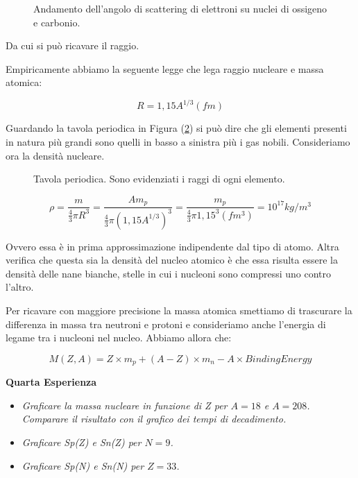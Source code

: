 \documentclass [a4paper, twoside] {book}
\begin{document}
\begin{figure} []
\centering
		\caption{Andamento dell'angolo di scattering di elettroni su nuclei di ossigeno e carbonio.}
         \label{scatteringatomicradius}
\end{figure}

Da cui si può ricavare il raggio.

Empiricamente abbiamo la seguente legge che lega raggio nucleare e massa atomica:

\begin{equation}
R=1,15A^{1/3} (fm)
\end{equation}

Guardando la tavola periodica in Figura (\ref{atomicradii}) si può dire che gli elementi presenti in natura più grandi sono quelli in basso a sinistra più i gas nobili.
Consideriamo ora la densità nucleare. 

\begin{figure} []
\centering
		\caption{Tavola periodica. Sono evidenziati i raggi di ogni elemento.}
         \label{atomicradii}
\end{figure}

\begin{equation}
\rho=\frac{m}{\frac{4}{3}\pi R^3}=\frac{Am_p}{\frac{4}{3}\pi (1,15 A^{1/3})^3}=\frac{m_p}{\frac{4}{3}\pi 1,15^3 (fm^3)} = 10^{17} kg/m^3
\end{equation}

Ovvero essa è in prima approssimazione indipendente dal tipo di atomo. 
Altra verifica che questa sia la densità del nucleo atomico è che essa risulta essere la densità delle nane bianche, stelle in cui i nucleoni sono compressi uno contro l'altro.
                                                                                                                    
Per ricavare con maggiore precisione la massa atomica smettiamo di trascurare la differenza in massa tra neutroni e protoni e consideriamo anche l'energia di legame tra i nucleoni nel nucleo. Abbiamo allora che:

\begin{equation}
M(Z,A)=Z\times m_p+(A-Z)\times m_n-A\times BindingEnergy
\end{equation}

\textbf{Quarta Esperienza}

\begin{itemize}
\item \emph{Graficare la massa nucleare in funzione di Z per $A=18$ e $A=208$. Comparare il risultato con il grafico dei tempi di decadimento.}
\item \emph{Graficare Sp(Z) e Sn(Z) per $N=9$.}
\item \emph{Graficare Sp(N) e Sn(N) per $Z=33$.}
\end{itemize}
\end{document}
